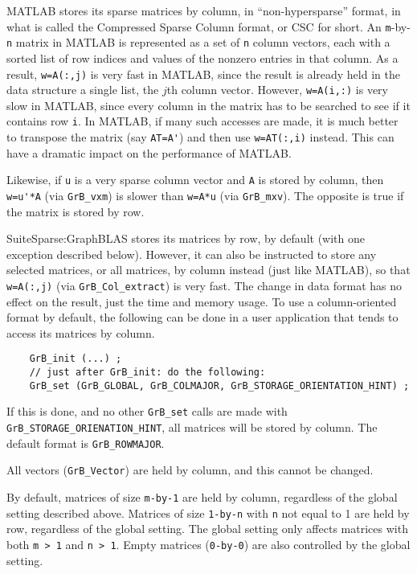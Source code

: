 MATLAB stores its sparse matrices by column, in ``non-hypersparse'' format, in
what is called the Compressed Sparse Column format, or CSC for short.  An
\verb'm'-by-\verb'n' matrix in MATLAB is represented as a set of \verb'n'
column vectors, each with a sorted list of row indices and values of the
nonzero entries in that column.  As a result, \verb'w=A(:,j)' is very fast in
MATLAB, since the result is already held in the data structure a single list,
the $j$th column vector.  However, \verb'w=A(i,:)' is very slow in MATLAB,
since every column in the matrix has to be searched to see if it contains row
\verb'i'.  In MATLAB, if many such accesses are made, it is much better to
transpose the matrix (say \verb"AT=A'") and then use \verb"w=AT(:,i)" instead.
This can have a dramatic impact on the performance of MATLAB.

Likewise, if \verb'u' is a very sparse column vector and \verb'A' is stored by
column, then \verb"w=u'*A" (via \verb'GrB_vxm') is slower than \verb'w=A*u'
(via \verb'GrB_mxv').  The opposite is true if the matrix is stored by row.

SuiteSparse:GraphBLAS stores its matrices by row, by default (with one
exception described below).  However, it can also be instructed to store any
selected matrices, or all matrices, by column instead (just like MATLAB), so
that \verb'w=A(:,j)' (via \verb'GrB_Col_extract') is very fast.  The change in
data format has no effect on the result, just the time and memory usage.  To
use a column-oriented format by default, the following can be done in a user
application that tends to access its matrices by column.

    {\footnotesize
    \begin{verbatim}
    GrB_init (...) ;
    // just after GrB_init: do the following:
    GrB_set (GrB_GLOBAL, GrB_COLMAJOR, GrB_STORAGE_ORIENTATION_HINT) ; \end{verbatim} }

If this is done, and no other \verb'GrB_set' calls are made with \newline
\verb'GrB_STORAGE_ORIENATION_HINT', all matrices will be stored by column.
The default format is \verb'GrB_ROWMAJOR'.

All vectors (\verb'GrB_Vector') are held by column, and this cannot be changed.

By default, matrices of size \verb'm-by-1' are held by column, regardless of
the global setting described above.  Matrices of size \verb'1-by-n' with
\verb'n' not equal to 1 are held by row, regardless of the global setting.
The global setting only affects matrices with both \verb'm > 1' and \verb'n > 1'.
Empty matrices (\verb'0-by-0') are also controlled by the global setting.

